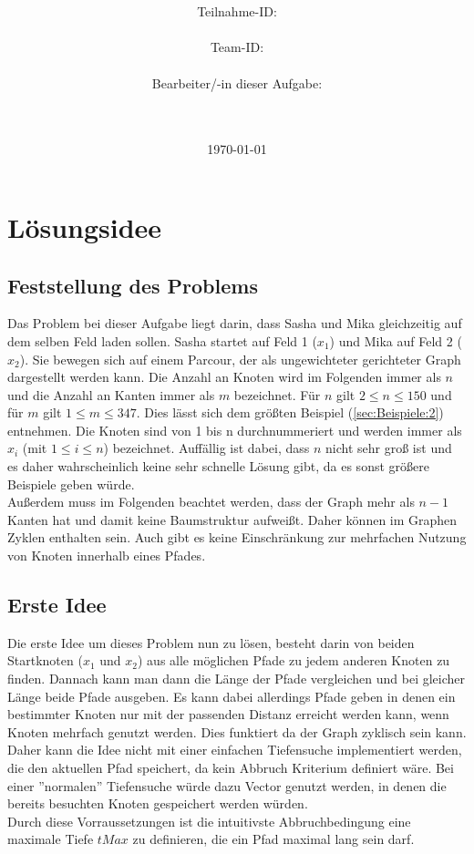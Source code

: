\documentclass[a4paper,10pt,ngerman]{scrartcl}
\title{\textbf{\Huge\Aufgabe}}
\author{\LARGE Teilnahme-ID: \LARGE \TeilnahmeId \\\\
      \LARGE Team-ID: \LARGE \TeamId \\\\
	    \LARGE Bearbeiter/-in dieser Aufgabe: \\ 
	    \LARGE \Name\\\\}
\date{\LARGE\today}
\begin{document}
  \maketitle
  \tableofcontents
  \vspace{6cm}

  \section{Lösungsidee\label{sec:Loesungsidee}}
    \subsection{Feststellung des Problems}
      Das Problem bei dieser Aufgabe liegt darin, dass Sasha und Mika gleichzeitig auf dem selben Feld laden sollen. Sasha startet auf Feld 1 ($x_{1}$) und Mika auf Feld 2 ($x_{2}$). Sie bewegen sich auf einem Parcour, der als ungewichteter gerichteter Graph dargestellt werden kann. Die Anzahl an Knoten wird im Folgenden immer als $n$ und die Anzahl an Kanten immer als $m$ bezeichnet. Für $n$ gilt $2 \leq n \leq 150$ und für $m$ gilt $1 \leq m \leq 347$. Dies lässt sich dem größten Beispiel (\cref{sec:Beispiele:2}) entnehmen. Die Knoten sind von 1 bis n durchnummeriert und werden immer als $x_{i}$ (mit $1 \leq i \leq n$) bezeichnet. Auffällig ist dabei, dass $n$ nicht sehr groß ist und es daher wahrscheinlich keine sehr schnelle Lösung gibt, da es sonst größere Beispiele geben würde.
      \\
      Außerdem muss im Folgenden beachtet werden, dass der Graph mehr als $n-1$ Kanten hat und damit keine Baumstruktur aufweißt. Daher können im Graphen Zyklen enthalten sein. Auch gibt es keine Einschränkung zur mehrfachen Nutzung von Knoten innerhalb eines Pfades.
    \subsection{Erste Idee\label{sec:Loesungsidee:1}}
      Die erste Idee um dieses Problem nun zu lösen, besteht darin von beiden Startknoten ($x_{1}$ und $x_{2}$) aus alle möglichen Pfade zu jedem anderen Knoten zu finden. Dannach kann man dann die Länge der Pfade vergleichen und bei gleicher Länge beide Pfade ausgeben. Es kann dabei allerdings Pfade geben in denen ein bestimmter Knoten nur mit der passenden Distanz erreicht werden kann, wenn Knoten mehrfach genutzt werden. Dies funktiert da der Graph zyklisch sein kann. Daher kann die Idee nicht mit einer einfachen Tiefensuche implementiert werden, die den aktuellen Pfad speichert, da kein Abbruch Kriterium definiert wäre. Bei einer ''normalen'' Tiefensuche würde dazu Vector genutzt werden, in denen die bereits besuchten Knoten gespeichert werden würden.
      \\
      Durch diese Vorraussetzungen ist die intuitivste Abbruchbedingung eine maximale Tiefe $tMax$ zu definieren, die ein Pfad maximal lang sein darf.
\end{document}
